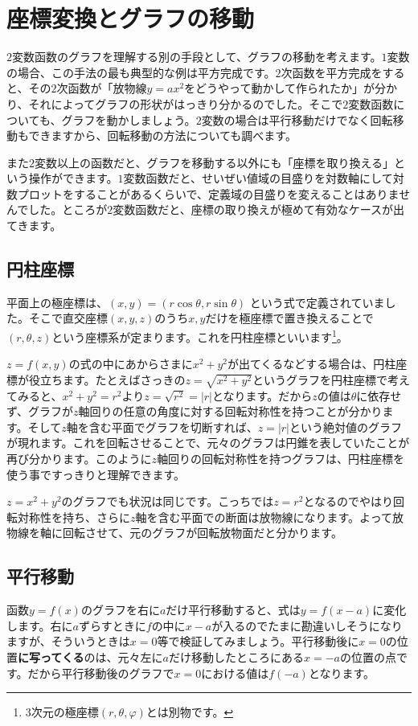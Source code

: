 \section{座標変換とグラフの移動}

$2$変数函数のグラフを理解する別の手段として、グラフの移動を考えます。$1$変数の場合、この手法の最も典型的な例は平方完成です。$2$次函数を平方完成をすると、その$2$次函数が「放物線$y=ax^2$をどうやって動かして作られたか」が分かり、それによってグラフの形状がはっきり分かるのでした。そこで$2$変数函数についても、グラフを動かしましょう。$2$変数の場合は平行移動だけでなく回転移動もできますから、回転移動の方法についても調べます。

また$2$変数以上の函数だと、グラフを移動する以外にも「座標を取り換える」という操作ができます。$1$変数函数だと、せいぜい値域の目盛りを対数軸にして対数プロットをすることがあるくらいで、定義域の目盛りを変えることはありませんでした。ところが$2$変数函数だと、座標の取り換えが極めて有効なケースが出てきます。

\subsection{円柱座標}
平面上の極座標は、$(x,y) = (r\cos\theta, r\sin\theta)$ という式で定義されていました。そこで直交座標$(x,y,z)$のうち$x, y$だけを極座標で置き換えることで$(r,\theta,z)$という座標系が定まります。これを円柱座標といいます\footnote{$3$次元の極座標$(r,\theta,\varphi)$とは別物です。}。

$z=f(x,y)$の式の中にあからさまに$x^2+y^2$が出てくるなどする場合は、円柱座標が役立ちます。たとえばさっきの$z=\sqrt{x^2+y^2}$というグラフを円柱座標で考えてみると、$x^2+y^2=r^2$より$z=\sqrt{r^2}=|r|$となります。だから$z$の値は$\theta$に依存せず、グラフが$z$軸回りの任意の角度に対する回転対称性を持つことが分かります。そして$z$軸を含む平面でグラフを切断すれば、$z=|r|$という絶対値のグラフが現れます。これを回転させることで、元々のグラフは円錐を表していたことが再び分かります。このように$z$軸回りの回転対称性を持つグラフは、円柱座標を使う事ですっきりと理解できます。

$z=x^2+y^2$のグラフでも状況は同じです。こっちでは$z=r^2$となるのでやはり回転対称性を持ち、さらに$z$軸を含む平面での断面は放物線になります。よって放物線を軸に回転させて、元のグラフが回転放物面だと分かります。

\subsection{平行移動}
函数$y=f(x)$のグラフを右に$a$だけ平行移動すると、式は$y=f(x-a)$に変化します。右に$a$ずらすときに$f$の中に$x-a$が入るのでたまに勘違いしそうになりますが、そういうときは$x=0$等で検証してみましょう。平行移動後に$x=0$の位置\textbf{に写ってくる}のは、元々左に$a$だけ移動したところにある$x=-a$の位置の点です。だから平行移動後のグラフで$x=0$における値は$f(-a)$となります。

